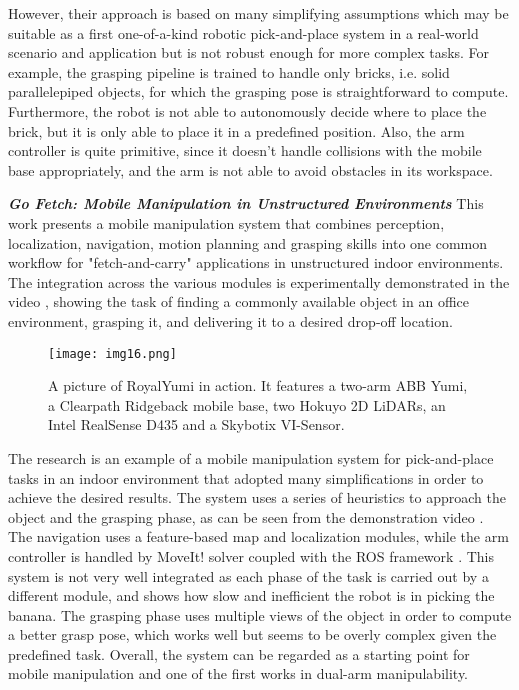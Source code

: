 However, their approach is based on many simplifying assumptions which may be suitable as a
first one-of-a-kind robotic pick-and-place system in a real-world scenario and application
but is not robust enough for more complex tasks. For example, the grasping pipeline
is trained to handle only bricks, i.e. solid parallelepiped objects, for which the grasping pose
is straightforward to compute. Furthermore, the robot is not able to autonomously decide
where to place the brick, but it is only able to place it in a predefined position.
Also, the arm controller is quite primitive, since it doesn't handle collisions with the mobile base
appropriately, and the arm is not able to avoid obstacles in its workspace.

\textbf{\textit{Go Fetch: Mobile Manipulation in Unstructured Environments}} \quad
This work \cite{blomqvist2020gofetch} presents a mobile manipulation system
that combines perception, localization, navigation,
motion planning and grasping skills into one common workflow
for "fetch-and-carry" applications in unstructured indoor environments.
The integration across the various modules is experimentally demonstrated
in the video \cite{youtube2020gofetch}, showing the task of finding a commonly available
object in an office environment, grasping it, and delivering it to a desired drop-off location.

\begin{figure}[t]
	\centering
	\texttt{[image: img16.png]}
	\captionsetup{width=0.8\linewidth}
	\caption{A picture of RoyalYumi in action. It features a two-arm ABB Yumi, a Clearpath
		Ridgeback mobile base, two Hokuyo 2D LiDARs, an	Intel RealSense D435 and a Skybotix VI-Sensor.
		\cite{blomqvist2020gofetch}}
	\label{fig:img16}
\end{figure}

The research \cite{blomqvist2020gofetch} is an example of a mobile manipulation system
for pick-and-place tasks in an indoor environment that adopted many simplifications in order
to achieve the desired results. The system uses a series of heuristics to
approach the object and the grasping phase, as can be seen from the demonstration video
\cite{youtube2020gofetch}. The navigation uses a feature-based map and localization
modules, while the arm controller is handled by MoveIt! \cite{moveit2} solver coupled with
the ROS framework \cite{ros2}. This system is not very
well integrated as each phase of the task is carried out by a different module, and shows
how slow and inefficient the robot is in picking the banana. The grasping phase uses multiple
views of the object in order to compute a better grasp pose, which works well
but seems to be overly complex given the predefined task. Overall, the system
can be regarded as a starting point for mobile manipulation and one of the first
works in dual-arm manipulability.

